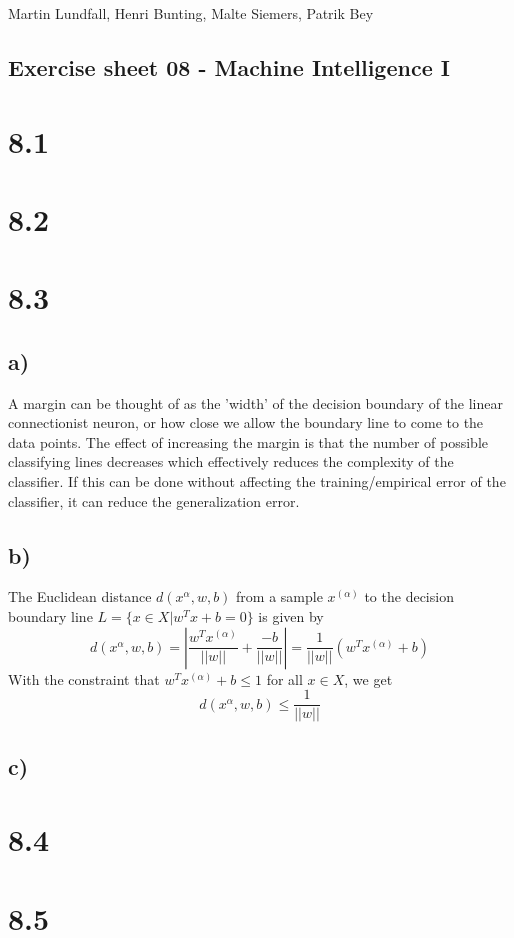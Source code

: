 \documentclass[11pt,a4paper]{article}
\begin{document}
\noindent
Martin Lundfall, Henri Bunting, Malte Siemers, Patrik Bey
\begin{centering}
  \section*{Exercise sheet 08 - Machine Intelligence I}
  \end{centering}
\section*{8.1}
\section*{8.2}
\section*{8.3}
\subsection*{a)}
A margin can be thought of as the 'width' of the decision boundary of the linear connectionist neuron, or how close we allow the boundary line to come to the data points. The effect of increasing the margin is that the number of possible classifying lines decreases which effectively reduces the complexity of the classifier. If this can be done without affecting the training/empirical error of the classifier, it can reduce the generalization error.
\subsection*{b)}
The Euclidean distance $d(x^\alpha,w,b)$ from a sample $x^{(\alpha)}$ to the decision boundary line $L = \{ x \in X | w^Tx + b = 0\}$ is given by 
\begin{equation}
d(x^\alpha,w,b) = |\frac{w^Tx^{(\alpha)}}{||w||}+\frac{- b}{||w||}| = \frac{1}{||w||}\left ( w^Tx^{(\alpha)} + b \right )
\end{equation}
With the constraint that $w^Tx^{(\alpha)} + b \leq 1$ for all $x \in X$, we get 
\begin{equation}
d(x^\alpha,w,b) \leq \frac{1}{||w||}
\end{equation}
\subsection*{c)}

\section*{8.4}
\section*{8.5}
\end{document}
